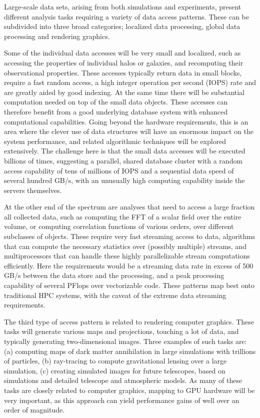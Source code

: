 Large-scale data sets, arising from both simulations and experiments,
present different analysis tasks requiring a variety of data access
patterns. These can be subdivided into three broad categories;
localized data processing, global data processing and rendering graphics.

Some of the individual data accesses will be very small and localized,
such as accessing the properties of individual halos or galaxies, and
recomputing their observational properties. These accesses typically
return data in small blocks, require a fast random access, a high 
integer operation per second (IOPS) rate
and are greatly aided by good indexing. At the same time there
will be substantial computation needed on top of the small data
objects. These accesses can therefore benefit from a good underlying
database system with enhanced computational capabilities. Going beyond
the hardware requirements, this is an area where the clever use of
data structures will have an enormous impact on the system
performance, and related algorithmic techniques will be explored
extensively. The challenge here is that the small data accesses will
be executed billions of times, suggesting a parallel, shared database
cluster with a random access capability of tens of millions of IOPS
and a sequential data speed of several hundred GB/s, with an unusually
high computing capability inside the servers themselves.

At the other end of the spectrum are analyses that need to access
a large fraction all collected data, such as computing the
FFT of a scalar field over the entire volume, or computing correlation
functions of various orders, over different subclasses of
objects. These require very fast streaming access to data, algorithms
that can compute the necessary statistics over (possibly multiple)
streams, and multiprocessors that can handle these highly parallelizable
stream computations efficiently.  Here the
requirements would be a streaming data rate in excess of 500 GB/s
between the data store and the processing, and a peak processing
capability of several PFlops over vectorizable code. These patterns
map best onto traditional HPC systems, with the caveat of the extreme
data streaming requirements.

The third type of access pattern is related to rendering computer
graphics. These tasks will generate various maps and projections,
touching a lot of data, and typically generating two-dimensional images. 
Three examples of such tasks are:
(a) computing maps of dark matter annihilation in large
simulations with trillions of particles, (b) ray-tracing to compute
gravitational lensing over a large simulation, (c) creating simulated
images for future telescopes, based on simulations and detailed
telescope and atmospheric models. As many of these tasks are closely
related to computer graphics, mapping to GPU hardware will be very
important, as this approach can yield performance gains of well over
an order of magnitude.

